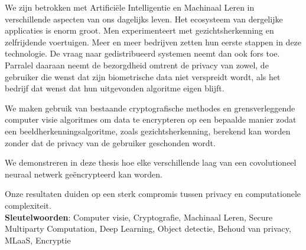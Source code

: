 We zijn betrokken met Artifici\"ele Intelligentie en Machinaal Leren in verschillende aspecten van ons dagelijks leven. Het ecosysteem van dergelijke applicaties is enorm groot. Men experimenteert met gezichtsherkenning en zelfrijdende voertuigen. Meer en meer bedrijven zetten hun eerste stappen in deze technologie. De vraag naar gedistribueerd systemen neemt dan ook fors toe. Parralel daaraan neemt de bezorgdheid omtrent de privacy van zowel, de gebruiker die wenst dat zijn biometrische data niet verspreidt wordt, als het bedrijf dat wenst dat hun uitgevonden algoritme eigen blijft.

We maken gebruik van bestaande cryptografische methodes en grensverleggende computer visie algoritmes om data te encrypteren op een bepaalde manier zodat een beeldherkenningsalgoritme, zoals gezichtsherkenning, berekend kan worden zonder dat de privacy van de gebruiker geschonden wordt.

We demonstreren in deze thesis hoe elke verschillende laag van een covolutioneel neuraal netwerk ge\"encrypteerd kan worden.

Onze resultaten duiden op een sterk compromis tussen privacy en computationele complexiteit.\\

\textbf{Sleutelwoorden}: Computer visie, Cryptografie, Machinaal Leren, Secure Multiparty Computation, Deep Learning, Object detectie, Behoud van privacy, MLaaS, Encryptie
